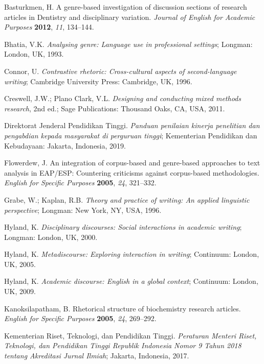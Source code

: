 \documentclass[journal,article,submit,pdftex,moreauthors]{Definitions/mdpi}
\begin{document}
\begin{thebibliography}{999}
 Basturkmen, H. A genre-based investigation of discussion sections of research articles in Dentistry and disciplinary variation. \textit{Journal of English for Academic Purposes} \textbf{2012}, \textit{11}, 134--144.

 Bhatia, V.K. \textit{Analysing genre: Language use in professional settings}; Longman: London, UK, 1993.

 Connor, U. \textit{Contrastive rhetoric: Cross-cultural aspects of second-language writing}; Cambridge University Press: Cambridge, UK, 1996.

 Creswell, J.W.; Plano Clark, V.L. \textit{Designing and conducting mixed methods research}, 2nd ed.; Sage Publications: Thousand Oaks, CA, USA, 2011.

 Direktorat Jenderal Pendidikan Tinggi. \textit{Panduan penilaian kinerja penelitian dan pengabdian kepada masyarakat di perguruan tinggi}; Kementerian Pendidikan dan Kebudayaan: Jakarta, Indonesia, 2019.

 Flowerdew, J. An integration of corpus-based and genre-based approaches to text analysis in EAP/ESP: Countering criticisms against corpus-based methodologies. \textit{English for Specific Purposes} \textbf{2005}, \textit{24}, 321--332.

 Grabe, W.; Kaplan, R.B. \textit{Theory and practice of writing: An applied linguistic perspective}; Longman: New York, NY, USA, 1996.

 Hyland, K. \textit{Disciplinary discourses: Social interactions in academic writing}; Longman: London, UK, 2000.

 Hyland, K. \textit{Metadiscourse: Exploring interaction in writing}; Continuum: London, UK, 2005.

 Hyland, K. \textit{Academic discourse: English in a global context}; Continuum: London, UK, 2009.

 Kanoksilapatham, B. Rhetorical structure of biochemistry research articles. \textit{English for Specific Purposes} \textbf{2005}, \textit{24}, 269--292.

 Kementerian Riset, Teknologi, dan Pendidikan Tinggi. \textit{Peraturan Menteri Riset, Teknologi, dan Pendidikan Tinggi Republik Indonesia Nomor 9 Tahun 2018 tentang Akreditasi Jurnal Ilmiah}; Jakarta, Indonesia, 2017.


\end{thebibliography}
\end{document}
